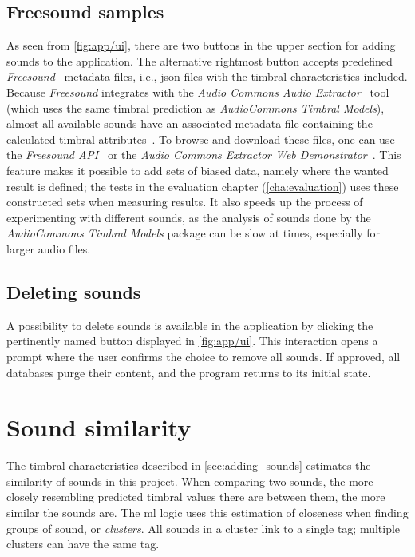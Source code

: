 \subsection{Freesound samples}
As seen from \cref{fig:app/ui}, there are two buttons in the upper section for adding sounds to the application. The alternative rightmost button accepts predefined \emph{Freesound}~\cite{freesound} metadata files, i.e., \gls{json} files with the timbral characteristics included. Because \emph{Freesound} integrates with the \emph{Audio Commons Audio Extractor}~\cite{ac-audio-extractor} tool (which uses the same timbral prediction as \emph{AudioCommons Timbral Models}), almost all available sounds have an associated metadata file containing the calculated timbral attributes~\cite{freesound:integration}. To browse and download these files, one can use the \emph{Freesound API}~\cite{freesound:api} or the \emph{Audio Commons Extractor Web Demonstrator}~\cite{ac-audio-extractor:web_demonstrator}. This feature makes it possible to add sets of biased data, namely where the wanted result is defined; the tests in the evaluation chapter (\cref{cha:evaluation}) uses these constructed sets when measuring results. It also speeds up the process of experimenting with different sounds, as the analysis of sounds done by the \emph{AudioCommons Timbral Models} package can be slow at times, especially for larger audio files.
\begin{mdframed}[style=code]
    
\end{mdframed}

\subsection{Deleting sounds}
A possibility to delete sounds is available in the application by clicking the pertinently named button displayed in \cref{fig:app/ui}. This interaction opens a prompt where the user confirms the choice to remove all sounds. If approved, all databases purge their content, and the program returns to its initial state.

\section{Sound similarity}\label{sec:sound_similarity}
The timbral characteristics described in \cref{sec:adding_sounds} estimates the similarity of sounds in this project. When comparing two sounds, the more closely resembling predicted timbral values there are between them, the more similar the sounds are. The \gls{ml} logic uses this estimation of closeness when finding groups of sound, or \emph{clusters}. All sounds in a cluster link to a single tag; multiple clusters can have the same tag.

